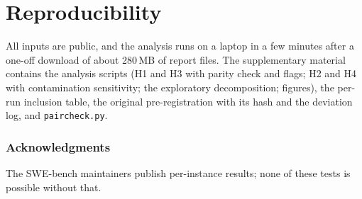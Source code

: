 \documentclass[10pt]{article}
\begin{document}
\section{Reproducibility}

All inputs are public, and the analysis runs on a laptop in a few minutes after a one-off download of about 280\,MB of report files. The supplementary material contains the analysis scripts (H1 and H3 with parity check and flags; H2 and H4 with contamination sensitivity; the exploratory decomposition; figures), the per-run inclusion table, the original pre-registration with its hash and the deviation log, and \texttt{paircheck.py}.

\subsubsection*{Acknowledgments}
The SWE-bench maintainers publish per-instance results; none of these tests is possible without that.



\end{document}
